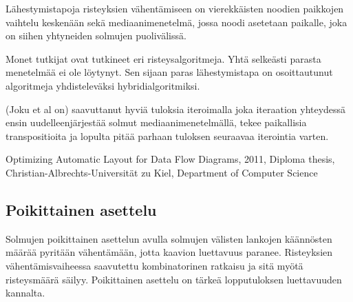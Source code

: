 \documentclass[finnish,12pt]{article}
\begin{document}
Lähestymistapoja risteyksien vähentämiseen on vierekkäisten noodien paikkojen vaihtelu keskenään sekä mediaanimenetelmä, jossa noodi asetetaan paikalle, joka on siihen yhtyneiden solmujen puolivälissä.

Monet tutkijat ovat
tutkineet eri risteysalgoritmeja. Yhtä selkeästi parasta menetelmää ei ole löytynyt. Sen sijaan paras lähestymistapa on osoittautunut algoritmeja yhdisteleväksi hybridialgoritmiksi.

(Joku et al on) saavuttanut hyviä tuloksia iteroimalla joka iteraation yhteydessä ensin uudelleenjärjestää solmut mediaanimenetelmällä, tekee paikallisia transpositioita ja lopulta pitää parhaan tuloksen seuraavaa iterointia varten.


Optimizing Automatic Layout for Data Flow Diagrams, 2011, Diploma thesis, Christian-Albrechts-Universität zu Kiel, Department of Computer Science

		\subsection{Poikittainen asettelu}

Solmujen poikittainen asettelun avulla solmujen välisten lankojen käännösten määrää pyritään vähentämään, jotta kaavion luettavuus paranee.
Risteyksien vähentämisvaiheessa saavutettu kombinatorinen ratkaisu ja sitä myötä risteysmäärä säilyy.
Poikittainen asettelu on tärkeä lopputuloksen luettavuuden kannalta.


\makeindex %
 
\end{document}
